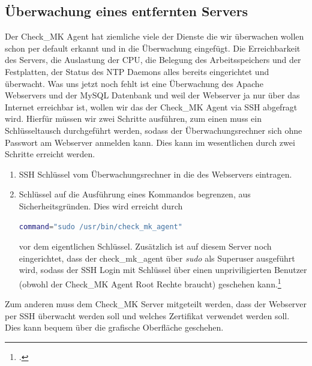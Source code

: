 \documentclass[12pt,a4paper,parskip,listof=totoc,bibliography=totoc]{scrreprt}
\begin{document}
	\subsection{Überwachung eines entfernten Servers}
	Der Check\_MK Agent hat ziemliche viele der Dienste die wir überwachen wollen schon per default erkannt und in die Überwachung eingefügt. Die Erreichbarkeit des Servers, die Auslastung der CPU, die Belegung des Arbeitsspeichers und der Festplatten, der Status des NTP Daemons alles bereits eingerichtet und überwacht. Was uns jetzt noch fehlt ist eine Überwachung des Apache Webservers und der MySQL Datenbank und weil der Webserver ja nur über das Internet erreichbar ist, wollen wir das der Check\_MK Agent via SSH abgefragt wird. Hierfür müssen wir zwei Schritte ausführen, zum einen muss ein Schlüsseltausch durchgeführt werden, sodass der Überwachungsrechner sich ohne Passwort am Webserver anmelden kann. Dies kann im wesentlichen durch zwei Schritte erreicht werden. 
	\begin{enumerate}
		\item SSH Schlüssel vom Überwachungsrechner in die  des Webservers eintragen.
		\item Schlüssel auf die Ausführung eines Kommandos begrenzen, aus Sicherheitsgründen. Dies wird erreicht durch
		\begin{lstlisting}[language=bash, caption=SSH Schlüssel auf ein Kommando begrenzen, label=lst:keybegr]
		command="sudo /usr/bin/check_mk_agent"\end{lstlisting}
		vor dem eigentlichen Schlüssel. Zusätzlich ist auf diesem Server noch eingerichtet, dass der check\_mk\_agent über \textit{sudo} als Superuser ausgeführt wird, sodass der SSH Login mit Schlüssel über einen unpriviligierten Benutzer (obwohl der Check\_MK Agent Root Rechte braucht) geschehen kann.\footcite{checkmkCheckBySSH2015}
	\end{enumerate}
	Zum anderen muss dem Check\_MK Server mitgeteilt werden, dass der Webserver per SSH überwacht werden soll und welches Zertifikat verwendet werden soll. Dies kann bequem über die grafische Oberfläche geschehen.
\end{document}
